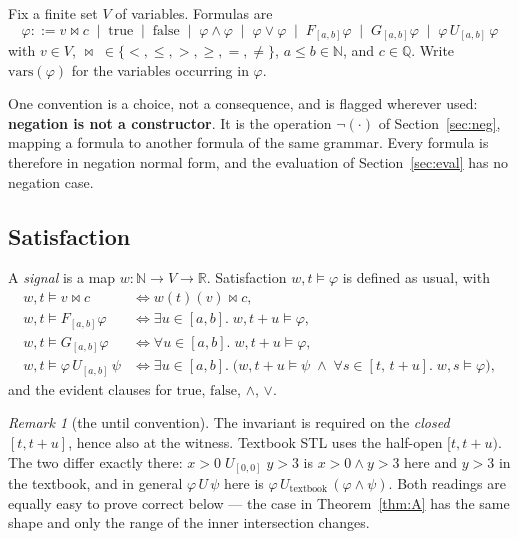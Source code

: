 \documentclass[11pt,a4paper]{article}
\theoremstyle{plain}
\theoremstyle{definition}
\theoremstyle{remark}
\newtheorem{remark}[theorem]{Remark}
\newcommand{\R}{\mathbb{R}}
\newcommand{\N}{\mathbb{N}}
\newcommand{\Q}{\mathbb{Q}}
\begin{document}
Fix a finite set $V$ of variables. Formulas are
\[
  \varphi ::= v \bowtie c \;\mid\; \mathrm{true} \;\mid\; \mathrm{false}
  \;\mid\; \varphi \wedge \varphi \;\mid\; \varphi \vee \varphi
  \;\mid\; F_{[a,b]}\varphi \;\mid\; G_{[a,b]}\varphi
  \;\mid\; \varphi \, U_{[a,b]} \, \varphi
\]
with $v \in V$, $\bowtie \; \in \{<,\le,>,\ge,=,\ne\}$, $a \le b \in \N$, and
$c \in \Q$. Write $\mathrm{vars}(\varphi)$ for the variables occurring in
$\varphi$.

One convention is a choice, not a consequence, and is flagged wherever used:
\textbf{negation is not a constructor}. It is the operation $\lnot(\cdot)$ of
Section~\ref{sec:neg}, mapping a formula to another formula of the same grammar.
Every formula is therefore in negation normal form, and the evaluation of
Section~\ref{sec:eval} has no negation case.

\subsection{Satisfaction}

A \emph{signal} is a map $w : \N \to V \to \R$. Satisfaction $w,t \models
\varphi$ is defined as usual, with
\begin{align*}
  w,t \models v \bowtie c
    &\iff w(t)(v) \bowtie c,\\
  w,t \models F_{[a,b]}\varphi
    &\iff \exists u \in [a,b].\; w,t{+}u \models \varphi,\\
  w,t \models G_{[a,b]}\varphi
    &\iff \forall u \in [a,b].\; w,t{+}u \models \varphi,\\
  w,t \models \varphi \, U_{[a,b]} \, \psi
    &\iff \exists u \in [a,b].\;
       \bigl(w,t{+}u \models \psi \;\wedge\;
             \forall s \in [t,\,t{+}u].\; w,s \models \varphi\bigr),
\end{align*}
and the evident clauses for $\mathrm{true}$, $\mathrm{false}$, $\wedge$, $\vee$.

\begin{remark}[the until convention]\label{rem:until}
The invariant is required on the \emph{closed} $[t, t{+}u]$, hence also at the
witness. Textbook STL uses the half-open $[t, t{+}u)$. The two differ exactly
there: $x{>}0 \; U_{[0,0]} \; y{>}3$ is $x{>}0 \wedge y{>}3$ here and $y{>}3$
in the textbook, and in general $\varphi \, U \, \psi$ here is
$\varphi \, U_{\text{textbook}} \, (\varphi \wedge \psi)$. Both readings are
equally easy to prove correct below --- the case in
Theorem~\ref{thm:A} has the same shape and only the range of the inner
intersection changes.
\end{remark}
\end{document}

